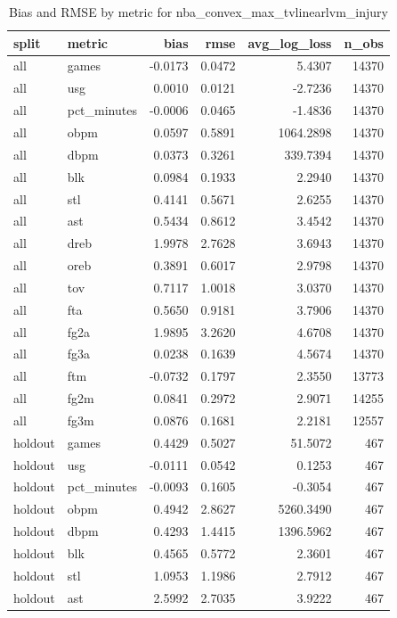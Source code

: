 \begin{table}
\caption{Bias and RMSE by metric for nba_convex_max_tvlinearlvm_injury}
\label{tab:nba_convex_max_tvlinearlvm_injury_bias_rmse}
\begin{tabular}{llrrrr}
\toprule
split & metric & bias & rmse & avg\_log\_loss & n\_obs \\
\midrule
all & games & -0.0173 & 0.0472 & 5.4307 & 14370 \\
all & usg & 0.0010 & 0.0121 & -2.7236 & 14370 \\
all & pct\_minutes & -0.0006 & 0.0465 & -1.4836 & 14370 \\
all & obpm & 0.0597 & 0.5891 & 1064.2898 & 14370 \\
all & dbpm & 0.0373 & 0.3261 & 339.7394 & 14370 \\
all & blk & 0.0984 & 0.1933 & 2.2940 & 14370 \\
all & stl & 0.4141 & 0.5671 & 2.6255 & 14370 \\
all & ast & 0.5434 & 0.8612 & 3.4542 & 14370 \\
all & dreb & 1.9978 & 2.7628 & 3.6943 & 14370 \\
all & oreb & 0.3891 & 0.6017 & 2.9798 & 14370 \\
all & tov & 0.7117 & 1.0018 & 3.0370 & 14370 \\
all & fta & 0.5650 & 0.9181 & 3.7906 & 14370 \\
all & fg2a & 1.9895 & 3.2620 & 4.6708 & 14370 \\
all & fg3a & 0.0238 & 0.1639 & 4.5674 & 14370 \\
all & ftm & -0.0732 & 0.1797 & 2.3550 & 13773 \\
all & fg2m & 0.0841 & 0.2972 & 2.9071 & 14255 \\
all & fg3m & 0.0876 & 0.1681 & 2.2181 & 12557 \\
holdout & games & 0.4429 & 0.5027 & 51.5072 & 467 \\
holdout & usg & -0.0111 & 0.0542 & 0.1253 & 467 \\
holdout & pct\_minutes & -0.0093 & 0.1605 & -0.3054 & 467 \\
holdout & obpm & 0.4942 & 2.8627 & 5260.3490 & 467 \\
holdout & dbpm & 0.4293 & 1.4415 & 1396.5962 & 467 \\
holdout & blk & 0.4565 & 0.5772 & 2.3601 & 467 \\
holdout & stl & 1.0953 & 1.1986 & 2.7912 & 467 \\
holdout & ast & 2.5992 & 2.7035 & 3.9222 & 467 \\

\end{tabular}
\end{table}
